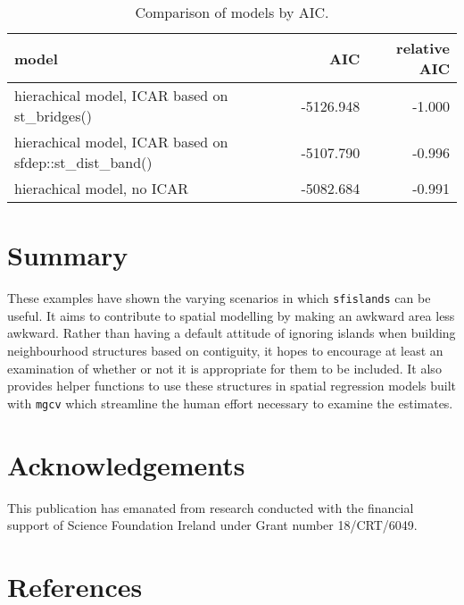 \begin{table}

\caption{\label{tab:aic-latex}Comparison of models by AIC.}
\centering
\fontsize{8}{10}\selectfont
\begin{tabular}[t]{l|r|r}
\hline
\textbf{model} & \textbf{AIC} & \textbf{relative AIC}\\
\hline
hierachical model, ICAR based on st\_bridges() & -5126.948 & -1.000\\
\hline
hierachical model, ICAR based on sfdep::st\_dist\_band() & -5107.790 & -0.996\\
\hline
hierachical model, no ICAR & -5082.684 & -0.991\\
\hline
\end{tabular}
\end{table}

\hypertarget{summary}{%
\section{Summary}\label{summary}}

These examples have shown the varying scenarios in which \texttt{sfislands} can be useful. It aims to contribute to spatial modelling by making an awkward area less awkward. Rather than having a default attitude of ignoring islands when building neighbourhood structures based on contiguity, it hopes to encourage at least an examination of whether or not it is appropriate for them to be included. It also provides helper functions to use these structures in spatial regression models built with \texttt{mgcv} which streamline the human effort necessary to examine the estimates.

\hypertarget{acknowledgements}{%
\section{Acknowledgements}\label{acknowledgements}}

This publication has emanated from research conducted with the financial support of Science Foundation Ireland under Grant number 18/CRT/6049.

\hypertarget{references}{%
\section*{References}\label{references}}

